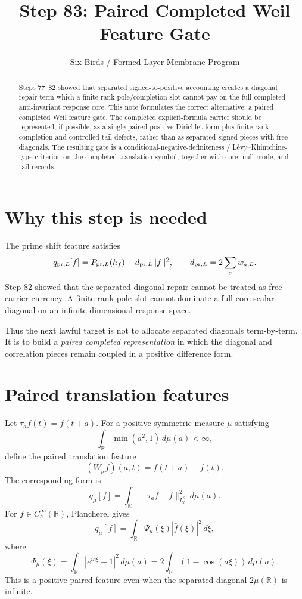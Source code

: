 \documentclass[11pt]{article}
\title{Step 83: Paired Completed Weil Feature Gate}
\author{Six Birds / Formed-Layer Membrane Program}
\date{}
\newcommand{\R}{\mathbb R}
\newcommand{\norm}[1]{\lVert #1\rVert}
\begin{document}
\maketitle

\begin{abstract}
Steps 77--82 showed that separated signed-to-positive accounting creates a diagonal repair term which a finite-rank pole/completion slot cannot pay on the full completed anti-invariant response core.  This note formulates the correct alternative: a paired completed Weil feature gate.  The completed explicit-formula carrier should be represented, if possible, as a single paired positive Dirichlet form plus finite-rank completion and controlled tail defects, rather than as separated signed pieces with free diagonals.  The resulting gate is a conditional-negative-definiteness / L\'evy--Khintchine-type criterion on the completed translation symbol, together with core, null-mode, and tail records.
\end{abstract}

\section{Why this step is needed}

The prime shift feature satisfies
\[
q_{{\rm pr},L}[f]
=
P_{{\rm pr},L}(h_f)+d_{{\rm pr},L}\norm{f}^2,
\qquad
 d_{{\rm pr},L}=2\sum_a w_{a,L}.
\]
Step 82 showed that the separated diagonal repair cannot be treated as free carrier currency.  A finite-rank pole slot cannot dominate a full-core scalar diagonal on an infinite-dimensional response space.

Thus the next lawful target is not to allocate separated diagonals term-by-term.  It is to build a \emph{paired completed representation} in which the diagonal and correlation pieces remain coupled in a positive difference form.

\section{Paired translation features}

Let \(\tau_a f(t)=f(t+a)\).  For a positive symmetric measure \(\mu\) satisfying
\[
\int_{\R}\min(a^2,1)\,d\mu(a)<\infty,
\]
define the paired translation feature
\[
(W_\mu f)(a,t)=f(t+a)-f(t).
\]
The corresponding form is
\[
q_\mu[f]
=
\int_\R \norm{\tau_a f-f}_{L^2_t}^2\,d\mu(a).
\]
For \(f\in C_c^\infty(\R)\), Plancherel gives
\[
q_\mu[f]
=
\int_\R \Psi_\mu(\xi)|\widehat f(\xi)|^2\,d\xi,
\]
where
\[
\Psi_\mu(\xi)
=
\int_\R |e^{ia\xi}-1|^2\,d\mu(a)
=
2\int_\R (1-\cos(a\xi))\,d\mu(a).
\]
This is a positive paired feature even when the separated diagonal \(2\mu(\R)\) is infinite.
\end{document}
